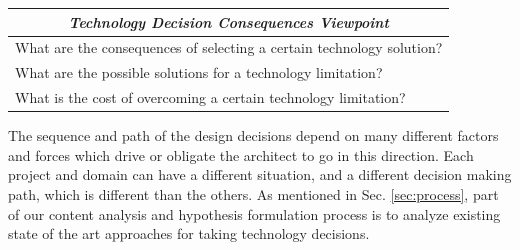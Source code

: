 \documentclass[conference]{IEEEtran}
\begin{document}
\begin{table}[t]
\begin{tabular}{|l|}
\multicolumn{1}{|c|}{\textit{\textbf{Technology Decision Consequences Viewpoint}}}                                                     \\ \hline
What are the consequences of selecting a certain technology solution?                                                                  \\
What are the possible solutions for a technology limitation?                                                                           \\
What is the cost of overcoming a certain technology limitation?                                                                        \\ \hline
\end{tabular}
\label{tab:viewpoints}
\end{table}
The sequence and path of the design decisions depend on many different factors
and forces \cite{AvgeriouForces} which drive or obligate the
architect to go in this direction. Each project and domain can have a different
situation, and a different decision making path, which is different than the
others. As mentioned in Sec. \ref{sec:process}, part of our content analysis and
hypothesis formulation process is to analyze existing state of the art
approaches for taking technology decisions. 
\end{document}
